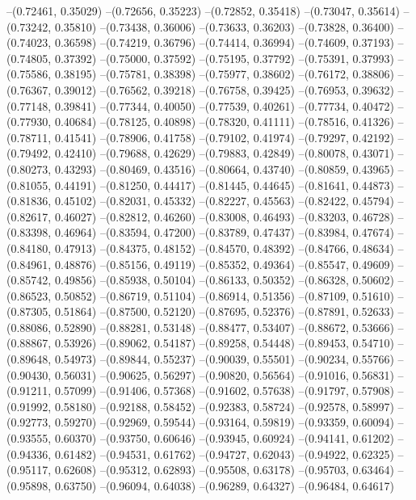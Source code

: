 --(0.72461, 0.35029)
--(0.72656, 0.35223)
--(0.72852, 0.35418)
--(0.73047, 0.35614)
--(0.73242, 0.35810)
--(0.73438, 0.36006)
--(0.73633, 0.36203)
--(0.73828, 0.36400)
--(0.74023, 0.36598)
--(0.74219, 0.36796)
--(0.74414, 0.36994)
--(0.74609, 0.37193)
--(0.74805, 0.37392)
--(0.75000, 0.37592)
--(0.75195, 0.37792)
--(0.75391, 0.37993)
--(0.75586, 0.38195)
--(0.75781, 0.38398)
--(0.75977, 0.38602)
--(0.76172, 0.38806)
--(0.76367, 0.39012)
--(0.76562, 0.39218)
--(0.76758, 0.39425)
--(0.76953, 0.39632)
--(0.77148, 0.39841)
--(0.77344, 0.40050)
--(0.77539, 0.40261)
--(0.77734, 0.40472)
--(0.77930, 0.40684)
--(0.78125, 0.40898)
--(0.78320, 0.41111)
--(0.78516, 0.41326)
--(0.78711, 0.41541)
--(0.78906, 0.41758)
--(0.79102, 0.41974)
--(0.79297, 0.42192)
--(0.79492, 0.42410)
--(0.79688, 0.42629)
--(0.79883, 0.42849)
--(0.80078, 0.43071)
--(0.80273, 0.43293)
--(0.80469, 0.43516)
--(0.80664, 0.43740)
--(0.80859, 0.43965)
--(0.81055, 0.44191)
--(0.81250, 0.44417)
--(0.81445, 0.44645)
--(0.81641, 0.44873)
--(0.81836, 0.45102)
--(0.82031, 0.45332)
--(0.82227, 0.45563)
--(0.82422, 0.45794)
--(0.82617, 0.46027)
--(0.82812, 0.46260)
--(0.83008, 0.46493)
--(0.83203, 0.46728)
--(0.83398, 0.46964)
--(0.83594, 0.47200)
--(0.83789, 0.47437)
--(0.83984, 0.47674)
--(0.84180, 0.47913)
--(0.84375, 0.48152)
--(0.84570, 0.48392)
--(0.84766, 0.48634)
--(0.84961, 0.48876)
--(0.85156, 0.49119)
--(0.85352, 0.49364)
--(0.85547, 0.49609)
--(0.85742, 0.49856)
--(0.85938, 0.50104)
--(0.86133, 0.50352)
--(0.86328, 0.50602)
--(0.86523, 0.50852)
--(0.86719, 0.51104)
--(0.86914, 0.51356)
--(0.87109, 0.51610)
--(0.87305, 0.51864)
--(0.87500, 0.52120)
--(0.87695, 0.52376)
--(0.87891, 0.52633)
--(0.88086, 0.52890)
--(0.88281, 0.53148)
--(0.88477, 0.53407)
--(0.88672, 0.53666)
--(0.88867, 0.53926)
--(0.89062, 0.54187)
--(0.89258, 0.54448)
--(0.89453, 0.54710)
--(0.89648, 0.54973)
--(0.89844, 0.55237)
--(0.90039, 0.55501)
--(0.90234, 0.55766)
--(0.90430, 0.56031)
--(0.90625, 0.56297)
--(0.90820, 0.56564)
--(0.91016, 0.56831)
--(0.91211, 0.57099)
--(0.91406, 0.57368)
--(0.91602, 0.57638)
--(0.91797, 0.57908)
--(0.91992, 0.58180)
--(0.92188, 0.58452)
--(0.92383, 0.58724)
--(0.92578, 0.58997)
--(0.92773, 0.59270)
--(0.92969, 0.59544)
--(0.93164, 0.59819)
--(0.93359, 0.60094)
--(0.93555, 0.60370)
--(0.93750, 0.60646)
--(0.93945, 0.60924)
--(0.94141, 0.61202)
--(0.94336, 0.61482)
--(0.94531, 0.61762)
--(0.94727, 0.62043)
--(0.94922, 0.62325)
--(0.95117, 0.62608)
--(0.95312, 0.62893)
--(0.95508, 0.63178)
--(0.95703, 0.63464)
--(0.95898, 0.63750)
--(0.96094, 0.64038)
--(0.96289, 0.64327)
--(0.96484, 0.64617)
